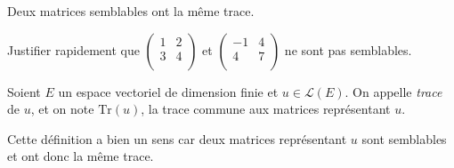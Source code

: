 \documentclass[a4paper,10pt]{report}
\begin{document}
\begin{Demonstration}{} 

\vspace{7cm}
\end{Demonstration}

\begin{Corollaire}{} Deux matrices semblables ont la même trace.
\end{Corollaire}

\begin{Demonstration}{} 
\vspace{3cm}
\end{Demonstration}


\begin{ApplicationDirecte} Justifier rapidement que $\begin{pmatrix}
1 & 2 \\
3 & 4 \\
\end{pmatrix}$ et $\begin{pmatrix}
-1 & 4 \\
4 & 7 \\
\end{pmatrix}$ ne sont pas semblables.
\end{ApplicationDirecte}



\begin{TheoremeDefinition}{} Soient $E$ un espace vectoriel de dimension finie et $u \in \mathcal{L}(E)$. On appelle \emph{trace} de $u$, et on note $\textrm{Tr}(u)$, la trace commune aux matrices représentant $u$.
\end{TheoremeDefinition}

\begin{Demonstration}{} Cette définition a bien un sens car deux matrices représentant $u$ sont semblables et ont donc la même trace.
\end{Demonstration}
\end{document}
